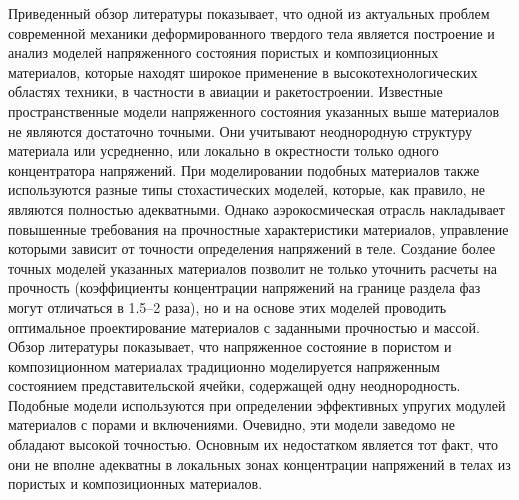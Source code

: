 Приведенный обзор литературы показывает, что одной из актуальных проблем современной механики деформированного твердого тела является построение и анализ моделей напряженного состояния пористых и композиционных материалов, которые находят широкое применение в высокотехнологических областях техники, в частности в авиации и ракетостроении. Известные пространственные модели напряженного состояния указанных выше материалов не являются достаточно точными. Они учитывают неоднородную структуру материала или усредненно, или локально в окрестности только одного концентратора напряжений. При моделировании подобных материалов также используются разные типы стохастических моделей, которые, как правило, не являются полностью адекватными. Однако аэрокосмическая отрасль накладывает повышенные требования на прочностные характеристики материалов, управление которыми зависит от точности определения напряжений в теле. Создание более точных моделей указанных материалов позволит не только уточнить расчеты на прочность (коэффициенты концентрации напряжений на границе раздела фаз могут отличаться в 1.5--2 раза), но и на основе этих моделей проводить оптимальное проектирование материалов с заданными прочностью и массой. Обзор литературы показывает, что напряженное состояние в пористом и композиционном материалах традиционно моделируется напряженным состоянием представительской ячейки, содержащей одну неоднородность. Подобные модели используются при определении эффективных упругих модулей материалов с порами и включениями. Очевидно, эти модели заведомо не обладают высокой точностью. Основным их недостатком является тот факт, что они не вполне адекватны в локальных зонах концентрации напряжений в телах из пористых и композиционных материалов.

